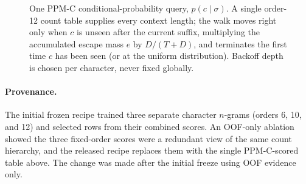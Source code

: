 \documentclass[11pt]{article}
\begin{document}
\begin{figure}[htbp]
\centering
{}
\caption{One PPM-C conditional-probability query, $p(c\mid\sigma)$. A single order-12 count table
supplies every context length; the walk moves right only when $c$ is unseen after the current
suffix, multiplying the accumulated escape mass $e$ by $D/(T{+}D)$, and terminates the first time
$c$ has been seen (or at the uniform distribution). Backoff depth is chosen per character, never
fixed globally.}
\label{fig:ppm-flow}
\end{figure}

\paragraph{Provenance.} The initial frozen recipe trained three separate character $n$-grams
(orders 6, 10, and 12) and selected rows from their combined scores. An OOF-only ablation showed the
three fixed-order scores were a redundant view of the same count hierarchy, and the released
recipe replaces them with the single PPM-C-scored table above. The change was made after the
initial freeze using OOF evidence only.
\end{document}
